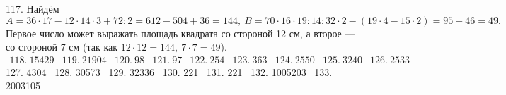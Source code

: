 117. Найдём $A=36\cdot17-12\cdot14\cdot3+72:2=612-504+36=144,\ B=70\cdot16\cdot19:14:32\cdot2-(19\cdot4-15\cdot2)=95-46=49.$ Первое число может выражать площадь квадрата со стороной 12 см, а второе --- со стороной 7 см (так как $12\cdot12=144,\ 7\cdot7=49$).\\
$\begin{array}{lllllllllllll}
118.\ 15429& 119.\ 21904& 120.\ 98& 121.\ 97& 122.\ 254& 123.\ 363 & 124.\ 2550 & 125.\ 3240 & 126.\ 2533 \end{array}$\\
127. 4304 \ 128. 30573 \ 129. 32336 \ 130. 221 \ 131. 221 \ 132. 1005203 \ 133. 2003105
\newpage

